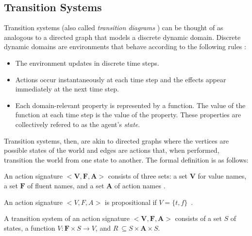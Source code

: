 \subsection{Transition Systems}
\label{subsec:transition_systems}

Transition systems (also called \textit{transition diagrams} \cite{blount_architecture_2013}) can be thought of as analogous to a directed graph that models a discrete dynamic domain.
Discrete dynamic domains are environments that behave according to the following rules \cite{blount_architecture_2013}:

\begin{itemize}
    \item The environment updates in discrete time steps.
    \item Actions occur instantaneously at each time step and the effects appear immediately at the next time step.
    \item Each domain-relevant property is represented by a function.
        The value of the function at each time step is the value of the property.
        These properties are collectively refered to as the agent's \textit{state}.
\end{itemize}

Transition systems, then, are akin to directed graphs where the vertices are possible states of the world and edges are actions that, when performed, transition the world from one state to another.
The formal definition is as follows:

\begin{definition}
    An action signature $ < \boldsymbol{V}, \boldsymbol{F}, \boldsymbol{A}> $ consists of three sets: a set $ \boldsymbol{V} $ for value names, a set $ \boldsymbol{F} $ of fluent names, and a set $ \boldsymbol{A} $ of action names \cite{gelfond_action_1998}.
\end{definition}

\begin{definition}
    An action signature $< V,F,A >$ is propositional if $V=\{t,f\}$~\cite{gelfond_action_1998}.
\end{definition}

\begin{definition}
    A transition system of an action signature $ < \boldsymbol{V}, \boldsymbol{F}, \boldsymbol{A}> $ consists of a set $ S $ of states, a function $ V : \boldsymbol{F} \times S\rightarrow V $, and $ R\ \subseteq S \times \boldsymbol{A} \times S $.
\end{definition}


